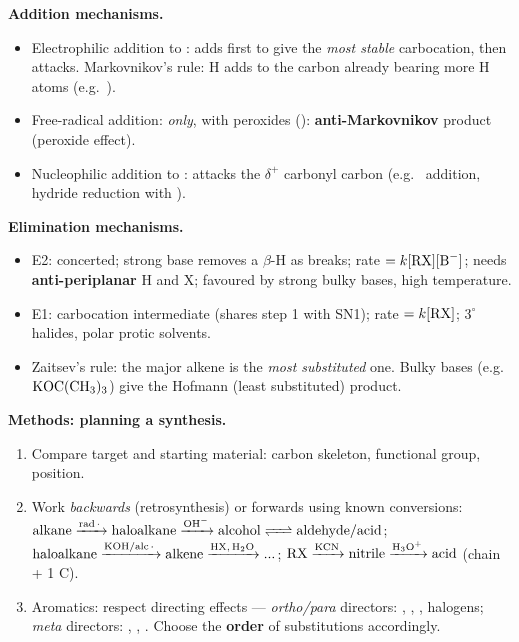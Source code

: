 \documentclass[11pt]{article}
\newcommand{\cle}[1]{{\popxbold\color{popdark}#1}}
\begin{document}
\begin{bilan}
\textbf{Addition mechanisms.}
\begin{itemize}
  \item \cle{Electrophilic addition} to :  adds first to give the \emph{most stable} carbocation, then  attacks. \cle{Markovnikov's rule}: H adds to the carbon already bearing more H atoms (e.g.\ ).
  \item \cle{Free-radical addition}:  \emph{only}, with peroxides (): \textbf{anti-Markovnikov} product  (peroxide effect).
  \item \cle{Nucleophilic addition} to :  attacks the $\delta^+$ carbonyl carbon (e.g.\  addition, hydride reduction with ).
\end{itemize}

\textbf{Elimination mechanisms.}
\begin{itemize}
  \item \cle{E2}: concerted; strong base removes a $\beta$-H as  breaks; rate $=k[\ce{RX}][\ce{B^-}]$; needs \textbf{anti-periplanar} H and X; favoured by strong bulky bases, high temperature.
  \item \cle{E1}: carbocation intermediate (shares step 1 with SN1); rate $=k[\ce{RX}]$; $3^\circ$ halides, polar protic solvents.
  \item \cle{Zaitsev's rule}: the major alkene is the \emph{most substituted} one. Bulky bases (e.g.\ $\ce{KOC(CH3)3}$) give the Hofmann (least substituted) product.
\end{itemize}

\textbf{Methods: planning a synthesis.}
\begin{enumerate}
  \item Compare target and starting material: carbon skeleton, functional group, position.
  \item Work \emph{backwards} (retrosynthesis) or forwards using known conversions: $\ce{alkane ->[rad.] haloalkane ->[OH^-] alcohol <=> aldehyde/acid}$; $\ce{haloalkane ->[KOH/alc.] alkene ->[HX, H2O] ...}$; $\ce{RX ->[KCN] nitrile ->[H3O+] acid}$ (chain + 1 C).
  \item Aromatics: respect \cle{directing effects} --- \emph{ortho/para} directors: , , , halogens; \emph{meta} directors: , , . Choose the \textbf{order} of substitutions accordingly.
\end{enumerate}


\end{bilan}
\end{document}
